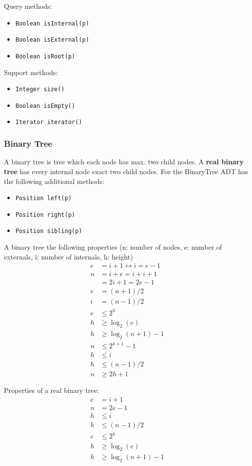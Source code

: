 \documentclass[11pt,twoside,landscape]{article}
\begin{document}
\begin{multicols}{2}
Query methods:
\begin{itemize}
\item \texttt{Boolean isInternal(p)}
\item \texttt{Boolean isExternal(p)}
\item \texttt{Boolean isRoot(p)}
\end{itemize}


Support methods:
\begin{itemize}
\item \texttt{Integer size()}
\item \texttt{Boolean isEmpty()}
\item \texttt{Iterator iterator()}
\end{itemize}

\subsubsection*{Binary Tree}
\label{sec:org4825523}
A binary tree is tree which each node has max. two child nodes. A \textbf{real binary tree} has every internal node exact two child nodes. For the BinaryTree ADT has the following additional methods:
\begin{itemize}
\item \texttt{Position left(p)}
\item \texttt{Position right(p)}
\item \texttt{Position sibling(p)}
\end{itemize}

A binary tree the following properties (n: number of nodes, e: number of externals, i: number of internals, h: height)
\begin{align*}
e &= i + 1 \leftrightarrow i = e - 1 \\
n &= i + e = i + i + 1 \\
&= 2i + 1 = 2e - 1 \\
e &= (n+1)/2 \\
i &= (n-1)/2 \\
e &\leq 2^h \\
h &\geq \log_2(e) \\
h &\geq \log_2(n+1)-1 \\
n &\leq 2^{h+1}-1 \\
h &\leq i \\
h &\leq (n-1)/2 \\
n &\geq 2h + 1
\end{align*}

Properties of a real binary tree:
\begin{align*}
e &= i + 1 \\
n &= 2e - 1 \\
h &\leq i \\
h &\leq (n-1)/2 \\
e &\leq 2^h \\
h &\geq \log_2(e) \\
h &\geq \log_2(n+1)-1
\end{align*}


\end{multicols}
\end{document}
